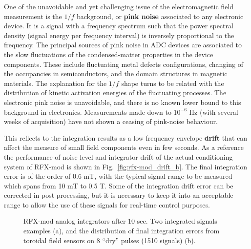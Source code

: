 One of the unavoidable and yet challenging issue of the electromagnetic field measurement is the $1/f$ background, or \textbf{pink noise} associated to any electronic device.
It is a signal with a frequency spectrum such that the power spectral density (signal energy per frequency interval) is inversely proportional to the frequency.
The principal sources of pink noise in ADC devices are associated to the slow fluctuations of the condensed-matter properties in the device components. These include fluctuating metal defects configurations, changing of the occupancies in semiconductors, and the domain structures in magnetic materials. The explanation for the $1/f$ shape turns to be related with the distribution of kinetic activation energies of the fluctuating processes.
The electronic pink noise is unavoidable, and there is no known lower bound to this background in electronics. Measurements made down to $10^{-6}$ Hz (with several weeks of acquisition) have not shown a ceasing of pink-noise behaviour.

This reflects to the integration results as a low frequency envelope \textbf{drift} that can affect the measure of small field components even in few seconds.
As a reference the performance of noise level and integrator drift of the actual conditioning system of RFX-mod is shown in Fig.~\ref{fig:rfx-mod_drift_b}. The final integration error is of the order of 0.6 mT, with the typical signal range to be measured which spans from 10 mT to 0.5 T. Some of the integration drift error can be corrected in post-processing, but it is necessary to keep it into an acceptable range to allow the use of these signals for real-time control purposes.
%
\begin{figure}
\centering
{}
\caption{RFX-mod analog integrators after 10 sec. Two integrated signals examples (a), and the distribution of final integration errors from toroidal field sensors on 8 “dry” pulses (1510 signals) (b).}
\label{fig:rfx-mod_drift}
\end{figure}


